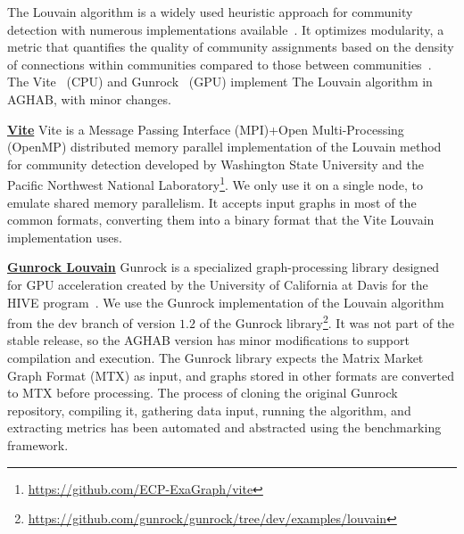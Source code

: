 The Louvain algorithm is a widely used heuristic approach for community detection with numerous implementations available~\cite{Blondel2008}. 
It optimizes modularity, a metric that quantifies the quality of community assignments based on the density of connections within communities compared to those between communities~\cite{Newman2004a}. 
The Vite~\cite{Ghosh2018,Ghosh2018a,Ghosh2019} (CPU) and Gunrock~\cite{Wang2016} (GPU) implement The Louvain algorithm in AGHAB, with minor changes.

    \underline{\textbf{Vite}}
        Vite is a Message Passing Interface (MPI)+Open Multi-Processing (OpenMP) distributed memory parallel implementation of the Louvain method for community detection developed by Washington State University and the Pacific Northwest National Laboratory\footnote{\url{https://github.com/ECP-ExaGraph/vite}}.
        We only use it on a single node, to emulate shared memory parallelism.
        It accepts input graphs in most of the common formats, converting them into a binary format that the Vite Louvain implementation uses.        

    \underline{\textbf{Gunrock Louvain}}
        Gunrock is a specialized graph-processing library designed for GPU acceleration created by the University of California at Davis for the HIVE program~\cite{Wang2016}. 
        We use the Gunrock implementation of the Louvain algorithm from the dev branch of version $1.2$ of the Gunrock library\footnote{\url{https://github.com/gunrock/gunrock/tree/dev/examples/louvain}}. It was not part of the stable release, so the AGHAB version has minor modifications to support compilation and execution. 
        The Gunrock library expects the Matrix Market Graph Format (MTX) as input, and graphs stored in other formats are converted to MTX before processing.  
        The process of cloning the original Gunrock repository, compiling it, gathering data input, running the algorithm, and extracting metrics has been automated and abstracted using the benchmarking framework.

